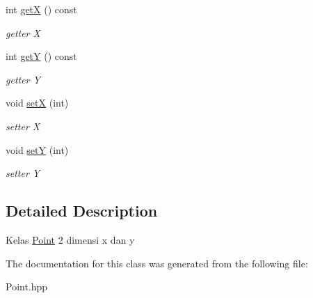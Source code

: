 \begin{DoxyCompactItemize}
int \hyperlink{classPoint_ac9d5859db121c7d1b89ca89266dca0a3}{getX} () const
\begin{DoxyCompactList}\small\item\em getter X \end{DoxyCompactList}\item 
\mbox{\label{classPoint_a86d10ff46e08462c45b15a8c7ef62d61}} 
int \hyperlink{classPoint_a86d10ff46e08462c45b15a8c7ef62d61}{getY} () const
\begin{DoxyCompactList}\small\item\em getter Y \end{DoxyCompactList}\item 
\mbox{\label{classPoint_a70df49e9bd07a4b86fd7c3fcb72b6fed}} 
void \hyperlink{classPoint_a70df49e9bd07a4b86fd7c3fcb72b6fed}{setX} (int)
\begin{DoxyCompactList}\small\item\em setter X \end{DoxyCompactList}\item 
\mbox{\label{classPoint_a00952d11c8b02ecf9d584b232edeee42}} 
void \hyperlink{classPoint_a00952d11c8b02ecf9d584b232edeee42}{setY} (int)
\begin{DoxyCompactList}\small\item\em setter Y \end{DoxyCompactList}\end{DoxyCompactItemize}


\subsection{Detailed Description}
Kelas \hyperlink{classPoint}{Point} 2 dimensi x dan y 

The documentation for this class was generated from the following file\+:\begin{DoxyCompactItemize}
\item 
Point.\+hpp\end{DoxyCompactItemize}
